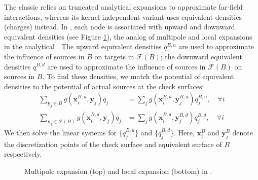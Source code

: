 The classic \fmm \cite{greengard1987fast, cheng1999fast} relies on truncated analytical expansions to approximate far-field interactions, whereas its kernel-independent variant \cite{ying2004kernel} uses equivalent densities (charges) instead.
In \kifmm, each node is associated with upward and downward equivalent densities (see Figure \ref{fig:multipole_local}), the analog of multipole and local expansions in the analytical \fmm.
The upward equivalent densities $q^{B,u}$ are used to approximate the influence of sources in $B$ on targets in $\mathcal{F}(B)$;
the downward equivalent densities $q^{B,d}$ are used to approximate the influence of sources in $\mathcal{F}(B)$ on sources in $B$.
To find these densities, we match the potential of equivalent densities to the potential of actual sources at the check surfaces:
%
\begin{align}\label{eq:multipole_local}
    \sum_{\mathbf{y}_{j} \in B} g\left(\mathbf{x}_{i}^{B,u}, \mathbf{y}_{j}\right) q_{j} &= \sum_{j} g\left(\mathbf{x}_{i}^{B,u}, \mathbf{y}^{B,u}_{j}\right) q^{B,u}_{j}, \quad \forall i  \nonumber \\
    \sum_{\mathbf{y}_{j} \in \mathcal{F}(B)} g\left(\mathbf{x}_{i}^{B,d}, \mathbf{y}_{j}\right) q_{j} &= \sum_{j} g\left(\mathbf{x}_{i}^{B,d}, \mathbf{y}^{B,d}_{j}\right) q^{B,d}_{j}, \quad \forall i
\end{align}
%
We then solve the linear systems for $\{q^{B,u}_{j}\}$ and $\{q^{B,d}_{j}\}$.
Here, $\mathbf{x}_{i}^{B}$ and $\mathbf{y}_{j}^{B}$ denote the discretization points of the check surface and equivalent surface of $B$ respectively.

\begin{figure}%
    \begin{subfigure}{\columnwidth}
        \centering
    \end{subfigure}

    \begin{subfigure}{\columnwidth}
        \centering
    \end{subfigure}

    \caption{Multipole expansion (top) and local expansion (bottom) in \kifmm.}
    \label{fig:multipole_local}
\end{figure}

